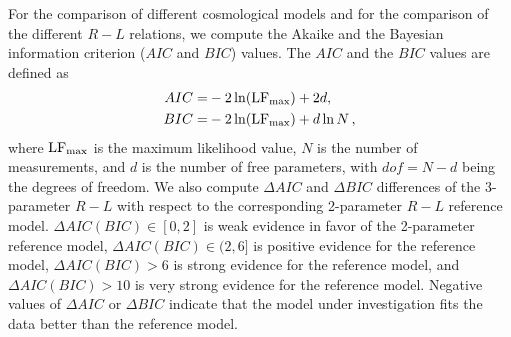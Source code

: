 \documentclass[a4paper,fleqn,usenatbib]{mnras}
\begin{document}
For the comparison of different cosmological models and for the comparison of the different $R-L$ relations, we compute the Akaike and the Bayesian information criterion ($AIC$ and $BIC$) values. The $AIC$ and the $BIC$ values are defined as
\begin{align}
\label{eq:AIC}
    AIC =& -2 \ln({\rm LF}_{\rm max}) + 2d,\\
\label{eq:BIC}
    BIC =& -2 \ln({\rm LF}_{\rm max}) + d\ln{N}\, ,
\end{align}
where $\rm LF_{\rm max}$ is the maximum likelihood value, $N$ is the number of measurements, and $d$ is the number of free parameters, with $dof = N - d$ being the degrees of freedom. We also compute $\Delta AIC$ and $\Delta BIC$ differences of the 3-parameter $R-L$ with respect to the corresponding 2-parameter $R-L$ reference model. $\Delta AIC(BIC) \in [0, 2]$ is weak evidence in favor of the 2-parameter reference model, $\Delta AIC(BIC) \in(2, 6]$ is positive evidence for the reference model, $\Delta AIC(BIC)>6$ is strong evidence for the reference model, and $\Delta AIC(BIC)>10$ is very strong evidence for the reference model.  Negative values of $\Delta AIC$ or $\Delta BIC$ indicate that the model under investigation fits the data better than the reference model.
\end{document}
